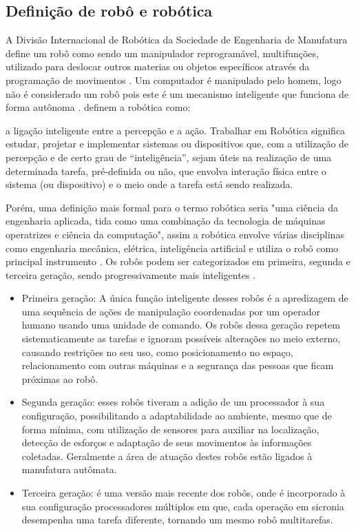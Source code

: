\subsection{Definição de robô e robótica}
A Divisão Internacional de Robótica da Sociedade de Engenharia de Manufatura define um robô como sendo um manipulador reprogramável, multifunções, utilizado para deslocar outros materias ou objetos específicos através da programação de movimentos \cite{de2008utilizaccao}. Um computador é manipulado pelo homem, logo não é considerado um robô pois este é um mecanismo inteligente que funciona de forma autônoma \cite{curcio2008instituto}.
	\cite{de2006robotica} definem a robótica como: 
\begin{citacao}
a ligação inteligente entre a percepção e a ação. Trabalhar em Robótica significa estudar, projetar e implementar sistemas ou dispositivos que, com a utilização de percepção e de certo grau de “inteligência”, sejam úteis na realização de uma determinada tarefa, pré-definida ou não, que envolva interação física entre o sistema (ou dispositivo) e o meio onde a tarefa está sendo realizada.
\end{citacao}
Porém, uma definição mais formal para o termo robótica seria "uma ciência da engenharia aplicada, tida como uma combinação da tecnologia de máquinas operatrizes e ciência da computação", assim a robótica envolve várias disciplinas como engenharia mecânica, elétrica, inteligência artificial e utiliza o robô como principal instrumento \cite{curcio2008instituto}.
Os robôs podem ser categorizados em primeira, segunda e terceira geração, sendo progressivamente mais inteligentes .
\begin{itemize}
\item Primeira geração: A única função inteligente desses robôs é a apredizagem de uma sequência de ações de manipulação coordenadas por um operador humano usando uma unidade de comando. Os robôs dessa geração repetem sistematicamente as tarefas e ignoram possíveis alterações no meio externo, causando restrições no seu uso, como posicionamento no espaço, relacionamento com outras máquinas e a segurança das pessoas que ficam próximas ao robô. 
\item Segunda geração: esses robôs tiveram a adição de um processador à sua configuração, possibilitando a adaptabilidade ao ambiente, mesmo que de forma mínima, com utilização de sensores para auxiliar na localização, detecção de esforços e adaptação de seus movimentos às informações coletadas. Geralmente a área de atuação destes robôs estão ligados à manufatura autômata.
\item Terceira geração: é uma versão mais recente dos robôs, onde é incorporado à sua configuração processadores múltiplos em que, cada operação em sicronia desempenha uma tarefa diferente, tornando um mesmo robô multitarefas.	 
\end{itemize}

